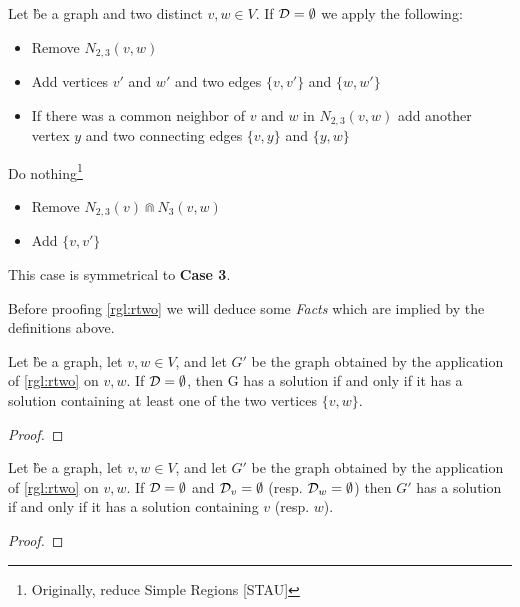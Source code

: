 \begin{rgl}\label{rgl:rtwo}
    Let \G be a graph and two distinct $v,w \in V$. If $\mathcal{D} = \emptyset$ we apply the following:
    \begin{caseof}

        \begin{itemize}
            \item Remove $N_{2,3}(v,w)$
            \item Add vertices $v'$ and $w'$ and two edges $\{v, v'\}$ and $\{w, w'\}$
            \item If there was a common neighbor of $v$ and $w$ in $N_{2,3}(v,w)$ add another vertex $y$ and two connecting edges  $\{v, y\}$ and $\{y, w\}$
        \end{itemize}
        Do nothing\footnote{Originally, reduce Simple Regions [STAU]}


        \begin{itemize}
            \item Remove $N_{2,3}(v) \Cap N_3(v,w)$
            \item Add $\{v, v'\}$ 
        \end{itemize}

         This case is symmetrical to \textbf{Case 3}. 
    \end{caseof}
\end{rgl}


Before proofing \cref*{rgl:rtwo} we will deduce some \textit{Facts} which are implied by the definitions above.

\begin{fact}
    Let \G be a graph, let $v,w \in V$, and let $G'$ be the graph obtained by the application of \cref*{rgl:rtwo} on $v,w$. If $\mathcal{D} = \emptyset$, then G has a solution if and only if it has a solution containing at least one of the two vertices $\{v,w \}$.
\end{fact}
\begin{proof}
    
\end{proof}

\begin{fact}
   Let \G be a graph, let $v,w \in V$, and let $G'$ be the graph obtained by the application of \cref*{rgl:rtwo} on $v, w$. If $\mathcal{D} = \emptyset$ and $\mathcal{D}_{v} = \emptyset$ (resp. $\mathcal{D}_{w} = \emptyset$) then $G'$ has a solution if and only if it has a solution containing $v$ (resp. $w$).
\end{fact}
\begin{proof}
    
\end{proof}


